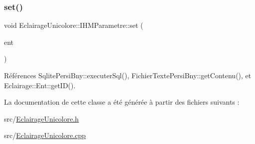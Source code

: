 \subsubsection{\texorpdfstring{set()}{set()}}
{\footnotesize\ttfamily void Eclairage\+Unicolore\+::\+I\+H\+M\+Parametre\+::set (\begin{DoxyParamCaption}\item[{\hyperlink{classEclairageUnicolore_1_1Ent}{Eclairage\+Unicolore\+::\+Ent} \&}]{ent }\end{DoxyParamCaption})}



Références Sqlite\+Persi\+Bny\+::executer\+Sql(), Fichier\+Texte\+Persi\+Bny\+::get\+Contenu(), et Eclairage\+::\+Ent\+::get\+I\+D().



La documentation de cette classe a été générée à partir des fichiers suivants \+:\begin{DoxyCompactItemize}
\item 
src/\hyperlink{EclairageUnicolore_8h}{Eclairage\+Unicolore.\+h}\item 
src/\hyperlink{EclairageUnicolore_8cpp}{Eclairage\+Unicolore.\+cpp}\end{DoxyCompactItemize}
